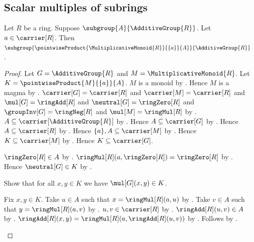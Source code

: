 \subsection{Scalar multiples of subrings}

\begin{theorem}\label{left_scalar_multiple_is_additive_subgroup}
    Let $R$ be a ring.
    Suppose $\subgroup{A}{\AdditiveGroup{R}}$.
    Let $a\in\carrier[R]$.
    Then
        $\subgroup{
            \pointwiseProduct{\MultiplicativeMonoid{R}}{\{a\}}{A}}
            {\AdditiveGroup{R}}$.
\end{theorem}
\begin{proof}
    Let $G=\AdditiveGroup{R}$ and $M=\MultiplicativeMonoid{R}$.
    Let $K=\pointwiseProduct{M}{\{a\}}{A}$.
    $M$ is a monoid by .
    Hence $M$ is a magma by .
    $\carrier[G]=\carrier[R]$ and $\carrier[M]=\carrier[R]$ and
        $\mul[G]=\ringAdd[R]$ and $\neutral[G]=\ringZero[R]$ and
        $\groupInv[G]=\ringNeg[R]$ and $\mul[M]=\ringMul[R]$ by
        .
    $A\subseteq\carrier[\AdditiveGroup{R}]$ by
        .
    Hence $A\subseteq\carrier[G]$ by \auto.
    Hence $A\subseteq\carrier[R]$ by \auto.
    Hence $\{a\},A\subseteq\carrier[M]$ by
        .
    Hence $K\subseteq\carrier[M]$ by
        .
    Hence $K\subseteq\carrier[G]$.

    $\ringZero[R]\in A$ by
        .
    $\ringMul[R](a,\ringZero[R])=\ringZero[R]$ by
        .
    Hence $\neutral[G]\in K$ by
        .

    Show that for all $x,y\in K$ we have $\mul[G](x,y)\in K$.
    \begin{subproof}
        Fix $x,y\in K$.
        Take $u\in A$ such that $x=\ringMul[R](a,u)$ by
            .
        Take $v\in A$ such that $y=\ringMul[R](a,v)$ by
            .
        $u,v\in\carrier[R]$ by .
        $\ringAdd[R](u,v)\in A$ by
            .
        $\ringAdd[R](x,y)=
            \ringMul[R](a,\ringAdd[R](u,v))$ by
            .
        Follows by
            .
    \end{subproof}


\end{proof}
